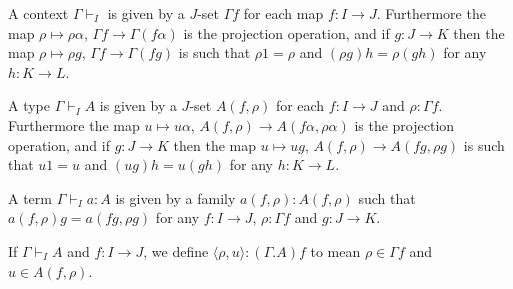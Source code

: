 \documentclass[english]{PaperTools/latex/lipics}
\begin{document}
\bigskip
A context $Γ ⊢_I$ is given by a $J$-set $Γf$ for each map $f : I → J$.
Furthermore the map $ρ ↦ ρα$, $Γf → Γ(fα)$ is the projection operation,
and if $g : J → K$ then the map $ρ ↦ ρg$, $Γf → Γ(fg)$ is such that
$ρ1 = ρ$ and $(ρg)h = ρ(gh)$ for any $h : K → L$.

\medskip
A type $Γ ⊢_I A$ is given by a $J$-set $A(f,ρ)$ for each $f : I → J$ and
$ρ : Γf$.
Furthermore the map $u ↦ uα$, $A(f,ρ) → A(fα,ρα)$ is the projection operation,
and if $g : J → K$ then the map $u ↦ ug$, $A(f,ρ) → A(fg,ρg)$ is such that
$u1 = u$ and $(ug)h = u(gh)$ for any $h : K → L$.

\medskip
A term $Γ ⊢_I a : A$ is given by a family $a(f,ρ) : A(f,ρ)$ such that
$a(f,ρ)g = a(fg,ρg)$ for any $f : I → J$, $ρ : Γf$ and $g : J → K$.

\medskip
If $Γ ⊢_I A$ and $f : I → J$, we define $⟨ρ,u⟩ : (Γ.A)f$ to mean
$ρ ∈ Γf$ and $u ∈ A(f,ρ)$.
\end{document}
